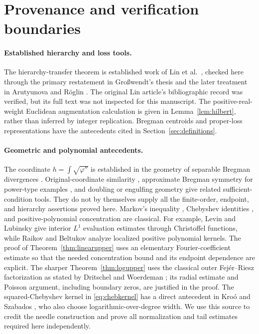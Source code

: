 \documentclass[11pt]{article}
\theoremstyle{definition}\newtheorem{definition}[theorem]{Definition}
\theoremstyle{remark}\newtheorem{remark}[theorem]{Remark}
\newcommand{\ph}{\varphi}
\begin{document}
\section{Provenance and verification boundaries}
\label{sec:provenance}
\paragraph{Established hierarchy and loss tools.}
The hierarchy-transfer theorem is established work of Lin et al.\ \cite{lin}, checked here through the primary restatement in Gro\ss wendt's thesis \cite[Theorem 2.11]{grosswendt} and the later treatment in Arutyunova and R\"oglin \cite{arutyunova}. The original Lin article's bibliographic record was verified, but its full text was not inspected for this manuscript. The positive-real-weight Euclidean augmentation calculation is given in Lemma~\ref{lem:hilbert}, rather than inferred by integer replication. Bregman centroids and proper-loss representations have the antecedents cited in Section~\ref{sec:definitions}.

\paragraph{Geometric and polynomial antecedents.}
The coordinate $h=\int\sqrt{\ph''}$ is established in the geometry of separable Bregman divergences \cite{gomes,gzyl}. Original-coordinate similarity \cite{ackermann}, approximate Bregman symmetry for power-type examples \cite{kindermann}, and doubling or engulfing geometry \cite{calogero,maldonado} give related sufficient-condition tools. They do not by themselves supply all the finite-order, endpoint, and hierarchy assertions proved here. Markov's inequality \cite{shadrin}, Chebyshev identities \cite{dlmf}, and positive-polynomial concentration are classical. For example, Levin and Lubinsky \cite[Theorem 1.3]{levin} give interior $L^1$ evaluation estimates through Christoffel functions, while Raikov and Beltukov \cite{raikov} analyze localized positive polynomial kernels. The proof of Theorem~\ref{thm:linearupper} uses an elementary Fourier-coefficient estimate so that the needed concentration bound and its endpoint dependence are explicit. The sharper Theorem~\ref{thm:logupper} uses the classical outer Fej\'er--Riesz factorization as stated by Dritschel and Woerdeman \cite[Introduction]{dritschelwoerdeman}; its radial estimate and Poisson argument, including boundary zeros, are justified in the proof. The squared-Chebyshev kernel in \eqref{eq:chebkernel} has a direct antecedent in Kro\'o and Szabados \cite[Proposition 1]{krooszabados}, who also choose logarithmic-over-degree width. We use this source to credit the needle construction and prove all normalization and tail estimates required here independently.
\end{document}
